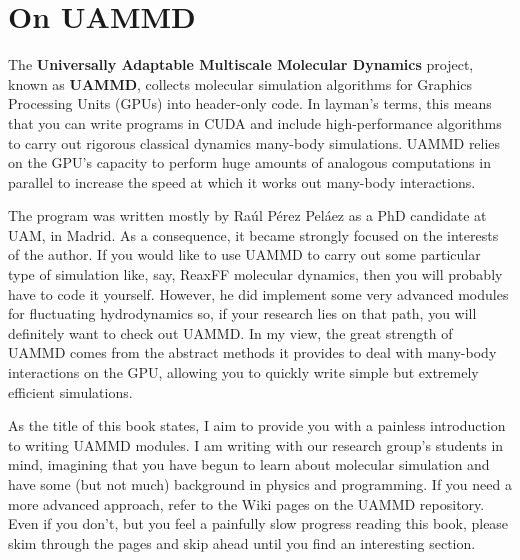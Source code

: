 
\section*{On UAMMD}

The \textbf{Universally Adaptable Multiscale Molecular Dynamics} project,
known as \textbf{UAMMD}, collects molecular simulation algorithms for Graphics 
Processing Units (GPUs) into header-only code. In layman's terms, this means 
that you can write programs in CUDA and include high-performance algorithms to 
carry out rigorous classical dynamics many-body simulations. UAMMD relies on the 
GPU's capacity to perform huge amounts of analogous computations in parallel to 
increase the speed at which it works out many-body interactions.

The program was written mostly by Ra\'ul P\'erez Pel\'aez as a PhD candidate at
UAM, in Madrid. As a consequence, it became strongly focused on the interests of
the author. If you would like to use UAMMD to carry out some particular type of
simulation like, say, ReaxFF molecular dynamics, then you will probably have to
code it yourself. However, he did implement some very advanced modules for
fluctuating hydrodynamics so, if your research lies on that path, you will
definitely want to check out UAMMD. In my view, the great strength of UAMMD
comes from the abstract methods it provides to deal with many-body interactions
on the GPU, allowing you to quickly write simple but extremely efficient
simulations.

As the title of this book states, I aim to provide you with a painless 
introduction to writing UAMMD modules. I am writing with our research group's 
students in mind, imagining that you have begun to learn about molecular
simulation and have some (but not much) background in physics and programming.
If you need a more advanced approach, refer to the Wiki pages on the UAMMD
repository. Even if you don't, but you feel a painfully slow progress reading
this book, please skim through the pages and skip ahead until you find an
interesting section.

